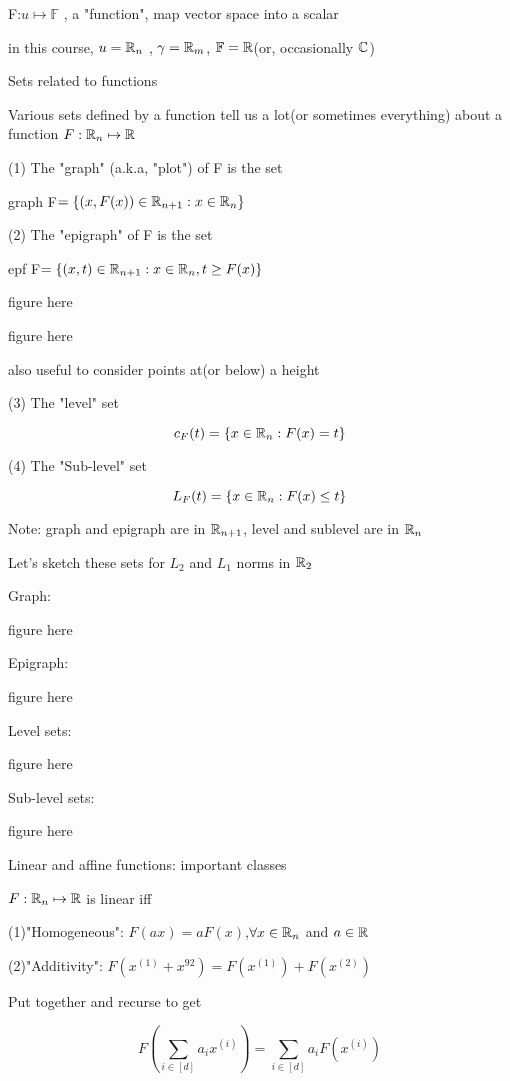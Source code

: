 F:$u\mapsto \mathbb{F}$ , a "function", map vector space into a scalar

in this course, $u=\mathbb{R}_{n}$ , $\gamma=\mathbb{R}_{m}$, $\mathbb{F}=\mathbb{R}$(or, occasionally $\mathbb{C}$)



Sets related to functions

Various sets defined by a function tell us a lot(or sometimes everything) about a function $F:\mathbb{R}_{n}\mapsto\mathbb{R}$

(1) The "graph" (a.k.a, "plot") of F is the set

graph F$=\{(x,F(x))\in\mathbb{R}_{n+1}:x\in\mathbb{R}_{n}\}$

(2) The "epigraph" of F is the set 

epf F$=\{(x,t)\in\mathbb{R}_{n+1}:x\in\mathbb{R}_{n}, t\geq F(x) \}$

figure here

figure here


also useful to consider points at(or below) a height

(3) The "level" set

$$c_{F}(t)=\{x\in\mathbb{R}_{n}:F(x)=t\}$$

(4) The "Sub-level" set

$$L_{F}(t)=\{x\in\mathbb{R}_{n}:F(x)\leq t\}$$

Note: graph and epigraph are in $\mathbb{R}_{n+1}$, level and sublevel are in $\mathbb{R}_{n}$


Let's sketch these sets for $L_{2}$ and $L_{1}$ norms in $\mathbb{R}_{2}$

Graph:

figure here

Epigraph:

figure here

Level sets:

figure here

Sub-level sets:

figure here



Linear and affine functions: important classes

$F:\mathbb{R}_{n}\mapsto\mathbb{R}$ is linear iff

(1)"Homogeneous": $F(ax)=aF(x)$,$ \forall x\in\mathbb{R}_{n}$ and $a\in\mathbb{R}$

(2)"Additivity":  $F(x^{(1)}+x^{92})=F(x^{(1)})+F(x^{(2)})$

Put together and recurse to get 


$$F(\sum_{i\in [d]}^{}a_{i}x^{(i)})=\sum_{i\in [d]}^{}a_{i}F(x^{(i)})$$


